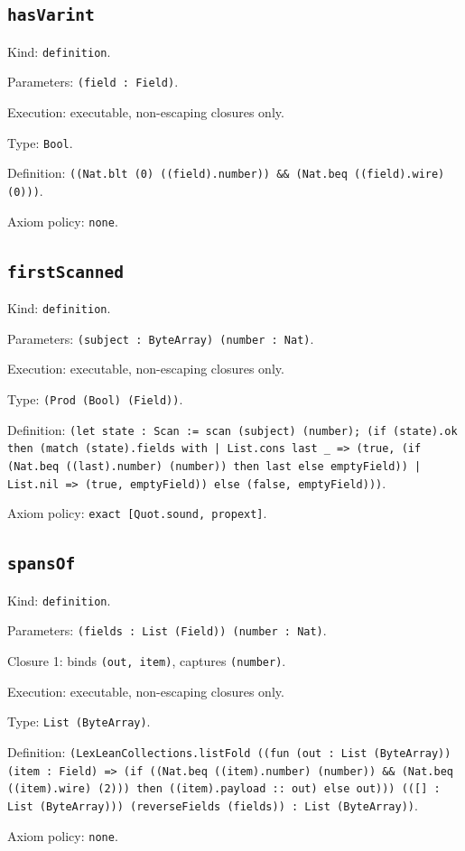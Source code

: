 \documentclass[11pt]{article}
\begin{document}
\subsection*{\texttt{hasVarint}}
\noindent Kind: \texttt{definition}.\par
\noindent Parameters: \texttt{(field : Field)}.\par
\noindent Execution: executable, non-escaping closures only.\par
\noindent Type: \texttt{Bool}.\par
\noindent Definition: \texttt{((Nat.blt (0) ((field).number)) \&\& (Nat.beq ((field).wire) (0)))}.\par
\noindent Axiom policy: \texttt{none}.\par
\subsection*{\texttt{firstScanned}}
\noindent Kind: \texttt{definition}.\par
\noindent Parameters: \texttt{(subject : ByteArray) (number : Nat)}.\par
\noindent Execution: executable, non-escaping closures only.\par
\noindent Type: \texttt{(Prod (Bool) (Field))}.\par
\noindent Definition: \texttt{(let state : Scan := scan (subject) (number); (if (state).ok then (match (state).fields with | List.cons last \_ => (true, (if (Nat.beq ((last).number) (number)) then last else emptyField)) | List.nil => (true, emptyField)) else (false, emptyField)))}.\par
\noindent Axiom policy: \texttt{exact [Quot.sound, propext]}.\par
\subsection*{\texttt{spansOf}}
\noindent Kind: \texttt{definition}.\par
\noindent Parameters: \texttt{(fields : List (Field)) (number : Nat)}.\par
\noindent Closure 1: binds \texttt{(out, item)}, captures \texttt{(number)}.\par
\noindent Execution: executable, non-escaping closures only.\par
\noindent Type: \texttt{List (ByteArray)}.\par
\noindent Definition: \texttt{(LexLeanCollections.listFold ((fun (out : List (ByteArray)) (item : Field) => (if ((Nat.beq ((item).number) (number)) \&\& (Nat.beq ((item).wire) (2))) then ((item).payload :: out) else out))) (([] : List (ByteArray))) (reverseFields (fields)) : List (ByteArray))}.\par
\noindent Axiom policy: \texttt{none}.\par
\end{document}
